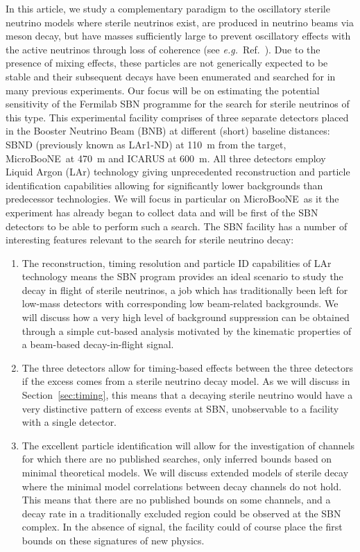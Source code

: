 \documentclass[11pt, a4paper]{article}
\newcommand{\refsec}[1]{Section~\ref{#1}}
\newcommand{\refref}[1]{Ref.~\cite{#1}}
\def\eg{\emph{e.g.}}
\def\muboone{MicroBooNE}
\begin{document}
In this article, we study a complementary paradigm to the oscillatory sterile
neutrino models where sterile neutrinos exist, are produced in neutrino beams
via meson decay, but have masses sufficiently large to prevent oscillatory
effects with the active neutrinos through loss of coherence (see \eg\
\refref{Akhmedov:2009rb}).  Due to the presence of mixing effects, these
particles are not generically expected to be stable and their subsequent decays
have been enumerated \cite{Atre:2009rg} and searched for in many previous
experiments.
%
Our focus will be on estimating the potential sensitivity of the Fermilab SBN
programme \cite{Antonello:2015lea} for the search for sterile neutrinos of this
type. 
%
This experimental facility comprises of three separate detectors placed in the
Booster Neutrino Beam (BNB) at different (short) baseline distances: SBND
(previously known as LAr1-ND) at 110~m from the target, \muboone\ at 470~m and
ICARUS at 600~m.  All three detectors employ Liquid Argon (LAr) technology
giving unprecedented reconstruction and particle identification capabilities
allowing for significantly lower backgrounds than predecessor technologies. We
will focus in particular on \muboone\ as it the experiment has already began
to collect data and will be first of the SBN detectors to be able to perform
such a search.
%
The SBN facility has a number of interesting features relevant to the search
for sterile neutrino decay:

\begin{enumerate}

\item The reconstruction, timing resolution and particle ID capabilities of LAr
technology means the SBN program provides an ideal scenario to study the decay
in flight of sterile neutrinos, a job which has traditionally been left for
low-mass detectors with corresponding low beam-related backgrounds. 
%
We will discuss how a very high level of background suppression can be obtained
through a simple cut-based analysis motivated by the kinematic properties of a
beam-based decay-in-flight signal. 

\item The three detectors allow for timing-based effects between 
the three detectors if the excess comes from a sterile neutrino decay 
model. As we will discuss in \refsec{sec:timing}, this means that a decaying 
sterile neutrino would have a very distinctive pattern of excess events at
SBN, unobservable to a facility with a single detector.

\item The excellent particle identification will allow for the investigation of
channels for which there are no published searches, only inferred bounds based
on minimal theoretical models. We will discuss extended models of sterile decay
where the minimal model correlations between decay channels do not hold. This
means that there are no published bounds on some channels, and a decay rate in
a traditionally excluded region could be observed at the SBN complex. In the
absence of signal, the facility could of course place the first bounds on these
signatures of new physics.

\end{enumerate} 
\end{document}
